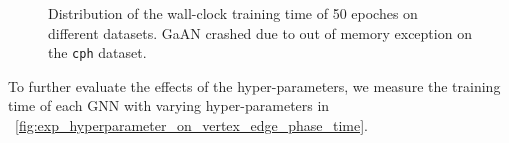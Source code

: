 \begin{figure}[htb]
    \caption{Distribution of the wall-clock training time of 50 epoches on different datasets. GaAN crashed due to out of memory exception on the \texttt{cph} dataset.}
    \label{fig:exp_absolute_training_time}
\end{figure}

To further evaluate the effects of the hyper-parameters, we measure the training time of each GNN with varying hyper-parameters in \figurename~\ref{fig:exp_hyperparameter_on_vertex_edge_phase_time}.

